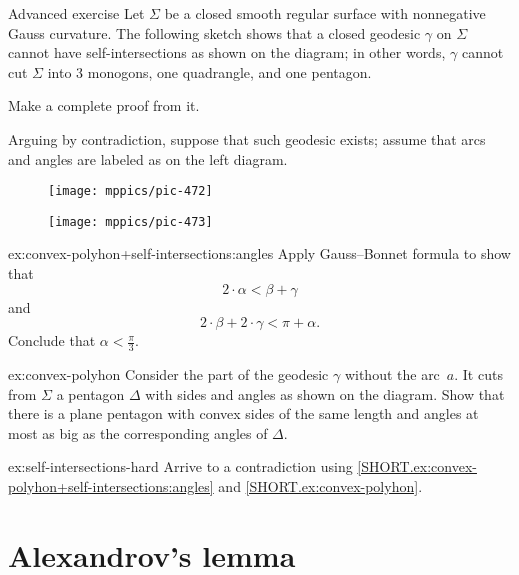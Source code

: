 \begin{thm}{Advanced exercise}\label{ex:convex-polyhon+self-intersections}
Let $\Sigma$ be a closed smooth regular surface with nonnegative Gauss curvature.
The following sketch shows that a closed geodesic $\gamma$ on $\Sigma$ cannot have self-intersections as shown on the diagram;
in other words, $\gamma$ cannot cut $\Sigma$ into 3 monogons, one quadrangle, and one pentagon. 

Make a complete proof from it.

Arguing by contradiction, suppose that such geodesic exists;
assume that arcs and angles are labeled as on the left diagram.

\begin{figure}[h!]
\begin{minipage}{.38\textwidth}
\centering
\texttt{[image: mppics/pic-472]}
\end{minipage}\hfill
\begin{minipage}{.58\textwidth}
\centering
\texttt{[image: mppics/pic-473]}
\end{minipage}
\end{figure}

\begin{subthm}{ex:convex-polyhon+self-intersections:angles}
Apply Gauss--Bonnet formula to show that
\[2\cdot\alpha<\beta+\gamma\]
and 
\[2\cdot\beta+2\cdot \gamma<\pi+\alpha.\]
Conclude that $\alpha <\tfrac \pi 3$.
\end{subthm}

\begin{subthm}{ex:convex-polyhon}
Consider the part of the geodesic $\gamma$ without the arc~$a$.
It cuts from $\Sigma$ a pentagon $\Delta$ with sides and angles as shown on the diagram. 
Show that there is a plane pentagon with convex sides of the same length and angles at most as big as the corresponding angles of $\Delta$.
\end{subthm}

\begin{subthm}{ex:self-intersections-hard}
Arrive to a contradiction using \ref{SHORT.ex:convex-polyhon+self-intersections:angles} and \ref{SHORT.ex:convex-polyhon}. 
\end{subthm}

\end{thm}

\section{Alexandrov's lemma}

